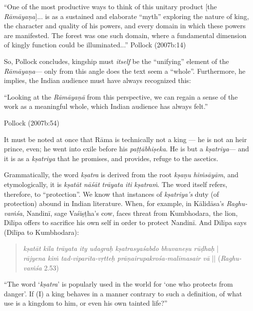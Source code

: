 \begin{myquote}
“One of the most productive ways to think of this unitary product [the {\sl Rāmāyaṇa}]... is as a sustained and elaborate “myth” exploring the nature of king, the character and quality of his powers, and every domain in which these powers are manifested. The forest was one such domain, where a fundamental dimension of kingly function could be illuminated...” 
\hfill Pollock (2007b:14)
\end{myquote}

So, Pollock concludes, kingship must {\sl itself} be the “unifying” element of the {\sl Rāmāyaṇa}--- only from this angle does the text seem a “whole”. Furthermore, he implies, the Indian audience must have always recognized this: 

\begin{myquote}
“Looking at the {\sl Rāmāyaṇā} from this perspective, we can regain a sense of the work as a meaningful whole, which Indian audience has always felt.”

\hfill  Pollock (2007b:54)
\end{myquote}

It must be noted at once that Rāma is technically not a king --- he is not an heir prince, even; he went into exile before his {\sl paṭṭābhiṣeka}. He is but a {\sl kṣatriya}--- and it is as a {\sl kṣatriya} that he promises, and provides, refuge to the ascetics. 

Grammatically, the word {\sl kṣatra} is derived from the root {\sl kṣaṇu hiṁsāyām}, and etymologically, it is {\sl kṣatāt nāśāt trāyata iti kṣatraṁ}. The word itself refers, therefore, to “protection”.  We know that instances of {\sl kṣatriya’s} duty (of protection) abound in Indian literature. When, for example, in Kālidāsa’s {\sl Raghu-vaṁśa}, Nandinī, sage Vaśiṣṭha’s cow, faces threat from Kumbhodara, the lion, Dilīpa offers to sacrifice his own self in order to protect Nandinī. And Dilīpa says (Dilīpa to Kumbhodara):
\begin{quote}
{{\sl kṣatāt kila trāyata ity udagraḥ kṣatrasya\newline śabdo bhuvaneṣu rūḍhaḥ}} |\\
{\sl rājyena kiṁ tad-viparīta-vṛtteḥ prāṇair\newline upakrośa-malīmasair vā} ||   
\hfill ({\sl Raghu-vaṁśa} 2.53)
\end{quote}

\begin{myquote}
“The word ‘{\sl kṣatra}’ is popularly used in the world for ‘one who protects from danger’. If (I) a king behaves in a manner contrary to such a definition, of what use is a kingdom to him, or even his own tainted life?”
\end{myquote}

